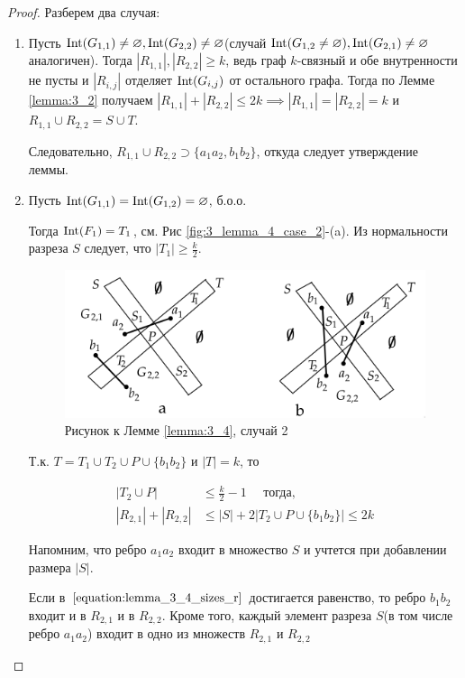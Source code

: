 \begin{proof}
	Разберем два случая:

	\begin{enumerate}
		\item Пусть $\operatorname{Int}(G_{1, 1}) \neq \varnothing, \operatorname{Int}(G_{2, 2}) \neq \varnothing$(случай $\operatorname{Int}(G_{1, 2} \neq \varnothing), \operatorname{Int}(G_{2, 1}) \neq \varnothing$ аналогичен).
			Тогда $|R_{1, 1}|, |R_{2,2}| \geqslant k$, ведь граф $k$-связный и обе внутренности не пусты и $|R_{i, j}|$ отделяет  $\operatorname{Int}(G_{i, j})$ от остального графа. Тогда по Лемме \ref{lemma:3_2} получаем $|R_{1,1}| + |R_{2,2}| \leqslant 2k \implies |R_{1,1}| = |R_{2,2}| = k$ и $R_{1, 1} \cup R_{2, 2} = S \cup T$.

			Следовательно,  $R_{1, 1} \cup R_{2, 2} \supset \{ a_1a_2, b_1b_2\}$, откуда следует утверждение леммы.

		\item Пусть  $\operatorname{Int}(G_{1, 1}) = \operatorname{Int}(G_{1, 2}) = \varnothing$, б.о.о.

			Тогда  $\operatorname{Int}(F_1) = T_1$, см. Рис \eqref{fig:3_lemma_4_case_2}-(a).
			Из нормальности разреза  $S$ следует, что  $|T_1| \geqslant \frac k 2$.

\begin{figure}[ht]
    \centering
	\includegraphics[width=0.5\columnwidth]{figures/3_lemma_4_case_2.png}
    \caption{Рисунок к Лемме \ref{lemma:3_4}, случай 2}
	\label{fig:3_lemma_4_case_2}
\end{figure}

Т.к. $T = T_1 \cup T_2 \cup P \cup \{b_1b_2\}$ и $|T| = k$, то 

\begin{align}
	|T_2 \cup P| &\leqslant \frac k 2 - 1 \quad \text{ тогда,  } \nonumber \\
	|R_{2, 1}| + |R_{2, 2}| &\leqslant |S| + 2 \left|T_2 \cup P \cup \{b_1b_2\}\right| \leqslant 2k \label{equation:lemma_3_4_sizes_r}
\end{align}

Напомним, что ребро $a_1a_2$ входит в множество $S$ и учтется при добавлении размера $|S|$.

Если в $\eqref{equation:lemma_3_4_sizes_r}$ достигается равенство, то ребро  $b_1b_2$ входит и в $R_{2,1}$ и в  $R_{2, 2}$.
Кроме того, каждый элемент разреза  $S$(в том числе ребро $a_1a_2$) входит в одно из множеств $R_{2,1}$ и  $R_{2,2}$


\end{enumerate}
\end{proof}
